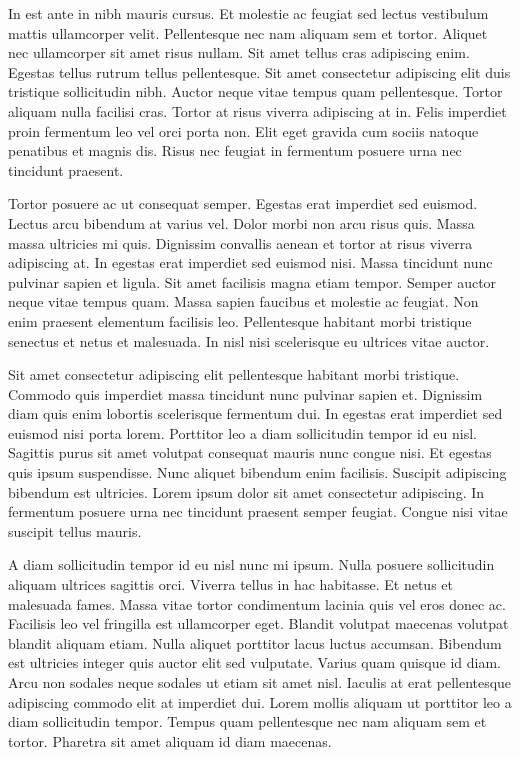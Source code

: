 \documentclass[british, twocolumn]{tktltiki2}
\theoremstyle{definition}
\theoremstyle{remark}
\begin{document}
In est ante in nibh mauris cursus. Et molestie ac feugiat sed lectus vestibulum mattis ullamcorper velit. Pellentesque nec nam aliquam sem et tortor. Aliquet nec ullamcorper sit amet risus nullam. Sit amet tellus cras adipiscing enim. Egestas tellus rutrum tellus pellentesque. Sit amet consectetur adipiscing elit duis tristique sollicitudin nibh. Auctor neque vitae tempus quam pellentesque. Tortor aliquam nulla facilisi cras. Tortor at risus viverra adipiscing at in. Felis imperdiet proin fermentum leo vel orci porta non. Elit eget gravida cum sociis natoque penatibus et magnis dis. Risus nec feugiat in fermentum posuere urna nec tincidunt praesent.

Tortor posuere ac ut consequat semper. Egestas erat imperdiet sed euismod. Lectus arcu bibendum at varius vel. Dolor morbi non arcu risus quis. Massa massa ultricies mi quis. Dignissim convallis aenean et tortor at risus viverra adipiscing at. In egestas erat imperdiet sed euismod nisi. Massa tincidunt nunc pulvinar sapien et ligula. Sit amet facilisis magna etiam tempor. Semper auctor neque vitae tempus quam. Massa sapien faucibus et molestie ac feugiat. Non enim praesent elementum facilisis leo. Pellentesque habitant morbi tristique senectus et netus et malesuada. In nisl nisi scelerisque eu ultrices vitae auctor.

Sit amet consectetur adipiscing elit pellentesque habitant morbi tristique. Commodo quis imperdiet massa tincidunt nunc pulvinar sapien et. Dignissim diam quis enim lobortis scelerisque fermentum dui. In egestas erat imperdiet sed euismod nisi porta lorem. Porttitor leo a diam sollicitudin tempor id eu nisl. Sagittis purus sit amet volutpat consequat mauris nunc congue nisi. Et egestas quis ipsum suspendisse. Nunc aliquet bibendum enim facilisis. Suscipit adipiscing bibendum est ultricies. Lorem ipsum dolor sit amet consectetur adipiscing. In fermentum posuere urna nec tincidunt praesent semper feugiat. Congue nisi vitae suscipit tellus mauris.

A diam sollicitudin tempor id eu nisl nunc mi ipsum. Nulla posuere sollicitudin aliquam ultrices sagittis orci. Viverra tellus in hac habitasse. Et netus et malesuada fames. Massa vitae tortor condimentum lacinia quis vel eros donec ac. Facilisis leo vel fringilla est ullamcorper eget. Blandit volutpat maecenas volutpat blandit aliquam etiam. Nulla aliquet porttitor lacus luctus accumsan. Bibendum est ultricies integer quis auctor elit sed vulputate. Varius quam quisque id diam. Arcu non sodales neque sodales ut etiam sit amet nisl. Iaculis at erat pellentesque adipiscing commodo elit at imperdiet dui. Lorem mollis aliquam ut porttitor leo a diam sollicitudin tempor. Tempus quam pellentesque nec nam aliquam sem et tortor. Pharetra sit amet aliquam id diam maecenas.
\end{document}
